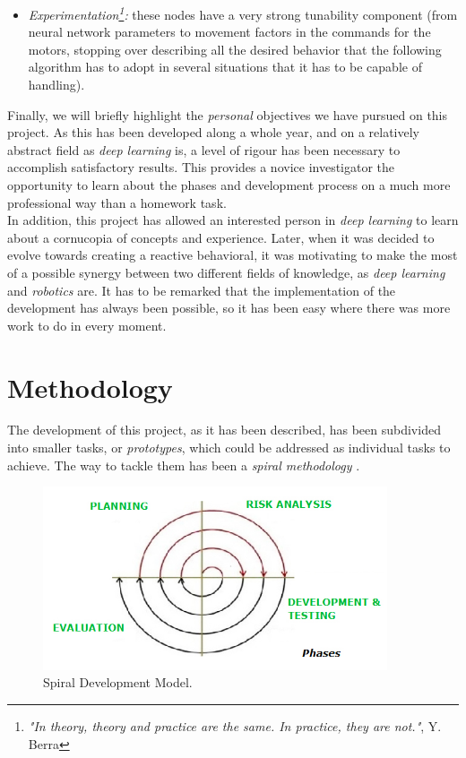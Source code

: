 \begin{itemize}
	\item \textit{Experimentation\footnote{\textit{"In theory, theory and practice are the same. In practice, they are not."}, Y. Berra}:} these nodes have a very strong tunability component (from neural network parameters to movement factors in the commands for the motors, stopping over describing all the desired behavior that the following algorithm has to adopt in several situations that it has to be capable of handling).
	
\end{itemize}

Finally, we will briefly highlight the \textit{personal} objectives we have pursued on this project. As this has been developed along a whole year, and on a relatively abstract field as \emph{deep learning} is, a level of rigour has been necessary to accomplish satisfactory results. This provides a novice investigator the opportunity to learn about the phases and development process on a much more professional way than a homework task. \\

In addition, this project has allowed an interested person in \emph{deep learning} to learn about a cornucopia of concepts and experience. Later, when it was decided to evolve towards creating a reactive behavioral, it was motivating to make the most of a possible synergy between two different fields of knowledge, as \emph{deep learning} and \emph{robotics} are. It has to be remarked that the implementation of the development has always been possible, so it has been easy where there was more work to do in every moment.

\section{Methodology}
The development of this project, as it has been described, has been subdivided into smaller tasks, or \emph{prototypes}, which could be addressed as individual tasks to achieve. The way to tackle them has been a \textit{spiral methodology} \cite{boehm-spiral}.\\

\begin{figure}[h]
	\centering
	\includegraphics[width=4in]{images/spiral}
	\caption{Spiral Development Model.}
	\label{fig:2_spiral}
\end{figure}


